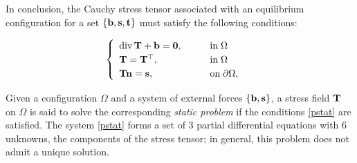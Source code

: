 \vspace{.2cm}
In conclusion, the Cauchy stress tensor associated with an equilibrium configuration for a set \(\{\mathbf{b}, \mathbf{s}, \mathbf{t}\}\) must satisfy the following conditions:
\begin{definition}
	\begin{equation}\label{pstat}
		\begin{cases}
			\begin{array}{ll}
				\operatorname{div} \mathbf{T} + \mathbf{b} = \mathbf{0}, & \qquad \text{in} \; \Omega \\
				\mathbf{T} = \mathbf{T}^\top, & \qquad \text{in} \; \Omega \\
				\mathbf{T} \mathbf{n} = \mathbf{s}, & \qquad \text{on} \; \partial \Omega,
			\end{array}
		\end{cases}
	\end{equation}
\end{definition}

Given a configuration \(\Omega\) and a system of external forces \(\{\mathbf{b}, \mathbf{s}\}\), a stress field \(\mathbf{T}\) on \(\Omega\) is said to solve the corresponding \textit{static problem} if the conditions \eqref{pstat} are satisfied. The system \eqref{pstat} forms a set of 3 partial differential equations with 6 unknowns, the components of the stress tensor; in general, this problem does not admit a unique solution.


